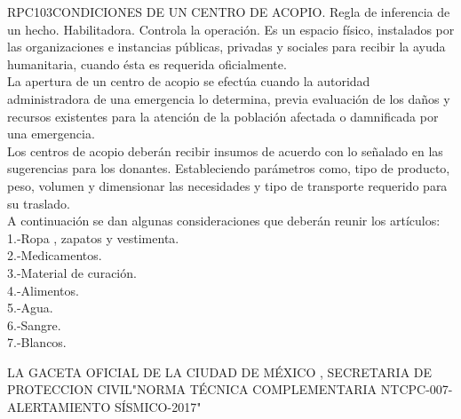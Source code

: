 \begin{BusinessRule}{RPC103}{CONDICIONES DE UN CENTRO DE ACOPIO.}{
		Regla de inferencia de un hecho.
	}{
		Habilitadora. 
	}{
		Controla la operación. %
	}
	\BRItem[Descripción:] Es un espacio físico, instalados por las organizaciones e instancias públicas, privadas y sociales para recibir la ayuda humanitaria, cuando ésta es requerida oficialmente.\\La apertura de un centro de acopio se efectúa cuando la autoridad administradora de una emergencia lo determina, previa evaluación de los daños y recursos existentes para la atención de la población afectada o damnificada por una emergencia. \\Los centros de acopio deberán recibir insumos de acuerdo con lo señalado en las sugerencias para los donantes. Estableciendo parámetros como, tipo de producto, peso, volumen y dimensionar las necesidades y tipo de transporte requerido para su traslado.\\A continuación se dan algunas consideraciones que deberán reunir los artículos:\\1.-Ropa , zapatos y vestimenta.\\2.-Medicamentos.\\3.-Material de curación.\\4.-Alimentos.\\5.-Agua.\\6.-Sangre.\\7.-Blancos.
	
	
	 LA GACETA OFICIAL DE LA CIUDAD DE MÉXICO , SECRETARIA DE PROTECCION CIVIL"NORMA TÉCNICA COMPLEMENTARIA NTCPC-007-ALERTAMIENTO SÍSMICO-2017"
\end{BusinessRule}
